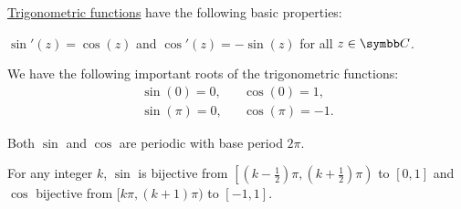 \begin{proposition}\label{thm:trigonometric_function_properties}
  \hyperref[def:trigonometric_functions]{Trigonometric functions} have the following basic properties:
  \begin{propenum}
     \( \sin'(z) = \cos(z) \) and \( \cos'(z) = -\sin(z) \) for all \( z \in \BC \).

     We have the following important roots of the trigonometric functions:
    \begin{align}
      \sin(0) = 0,   && \cos(0) = 1,    \label{thm:trigonometric_function_properties/zeros/zero} \\
      \sin(\pi) = 0, && \cos(\pi) = -1. \label{thm:trigonometric_function_properties/zeros/pi}
    \end{align}

     Both \( \sin \) and \( \cos \) are periodic with base period \( 2\pi \).

     For any integer \( k \), \( \sin \) is bijective from \( \left[(k - \tfrac 1 2) \pi, (k + \tfrac 1 2) \pi \right) \) to \( [0, 1] \) and \( \cos \) bijective from \( [k\pi, (k + 1)\pi) \) to \( [-1, 1] \).
  \end{propenum}
\end{proposition}
